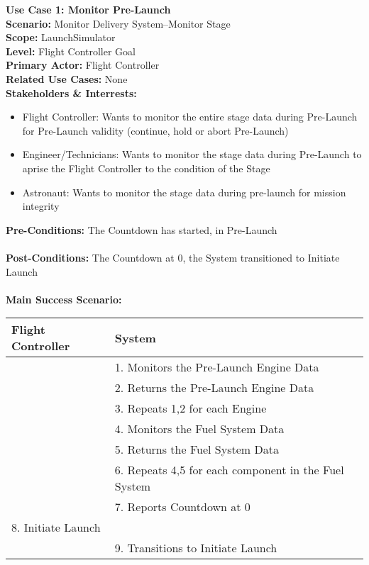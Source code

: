 \documentclass[letterpaper]{article}
\begin{document}
\noindent
\textbf{Use Case 1:  Monitor Pre-Launch}\\
\textbf{Scenario:  }Monitor Delivery System--Monitor Stage\\
\textbf{Scope:  }LaunchSimulator\\
\textbf{Level:  }Flight Controller Goal\\
\textbf{Primary Actor:  }Flight Controller\\
\textbf{Related Use Cases:  }None\\
\textbf{Stakeholders \& Interrests:}
\begin{itemize}
\item Flight Controller:  Wants to monitor the entire stage data during
Pre-Launch for Pre-Launch validity (continue, hold or abort Pre-Launch)
\item Engineer/Technicians:  Wants to monitor the stage data during
Pre-Launch to aprise the Flight Controller to the condition of the
Stage
\item Astronaut:  Wants to monitor the stage data during pre-launch
for mission integrity
\end{itemize}
\textbf{Pre-Conditions:  }The Countdown has started, in Pre-Launch\\\\
\textbf{Post-Conditions:  }The Countdown at 0, the System transitioned
to Initiate Launch\\\\
\textbf{Main Success Scenario:}\\
\begin{tabular}{|p{5.75cm}|p{5.75cm}|}\hline
\textbf{Flight Controller} & \textbf{System}\\\hline
& 1.  Monitors the Pre-Launch Engine Data\\\hline
& 2.  Returns the Pre-Launch Engine Data\\\hline
& 3.  Repeats 1,2 for each Engine\\\hline
& 4.  Monitors the Fuel System Data\\\hline
& 5.  Returns the Fuel System Data\\\hline
& 6.  Repeats 4,5 for each component in the Fuel System\\\hline
& 7.  Reports Countdown at 0\\\hline
8.  Initiate Launch & \\\hline
& 9.  Transitions to Initiate Launch\\\hline
\end{tabular}
\end{document}
